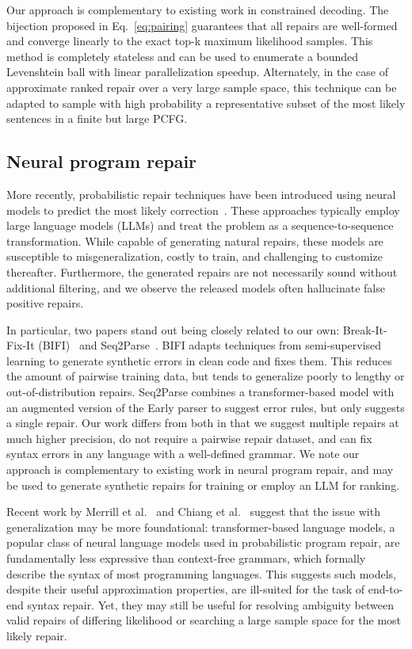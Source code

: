 \documentclass[runningheads]{llncs}
\begin{document}
  Our approach is complementary to existing work in constrained decoding. The bijection proposed in Eq.~\ref{eq:pairing} guarantees that all repairs are well-formed and converge linearly to the exact top-k maximum likelihood samples. This method is completely stateless and can be used to enumerate a bounded Levenshtein ball with linear parallelization speedup. Alternately, in the case of approximate ranked repair over a very large sample space, this technique can be adapted to sample with high probability a representative subset of the most likely sentences in a finite but large PCFG.

  \subsection{Neural program repair}

  More recently, probabilistic repair techniques have been introduced using neural models to predict the most likely correction~\cite{allamanis2021self,chirkova2021empirical,drain2021generating}. These approaches typically employ large language models (LLMs) and treat the problem as a sequence-to-sequence transformation. While capable of generating natural repairs, these models are susceptible to misgeneralization, costly to train, and challenging to customize thereafter. Furthermore, the generated repairs are not necessarily sound without additional filtering, and we observe the released models often hallucinate false positive repairs.

  In particular, two papers stand out being closely related to our own: Break-It-Fix-It (BIFI)~\cite{yasunaga2021break} and Seq2Parse~\cite{sakkas2022seq2parse}. BIFI adapts techniques from semi-supervised learning to generate synthetic errors in clean code and fixes them. This reduces the amount of pairwise training data, but tends to generalize poorly to lengthy or out-of-distribution repairs. Seq2Parse combines a transformer-based model with an augmented version of the Early parser to suggest error rules, but only suggests a single repair. Our work differs from both in that we suggest multiple repairs at much higher precision, do not require a pairwise repair dataset, and can fix syntax errors in any language with a well-defined grammar. We note our approach is complementary to existing work in neural program repair, and may be used to generate synthetic repairs for training or employ an LLM for ranking.

  Recent work by Merrill et al.~\cite{merrill2022saturated} and Chiang et al.~\cite{chiang2023tighter} suggest that the issue with generalization may be more foundational: transformer-based language models, a popular class of neural language models used in probabilistic program repair, are fundamentally less expressive than context-free grammars, which formally describe the syntax of most programming languages. This suggests such models, despite their useful approximation properties, are ill-suited for the task of end-to-end syntax repair. Yet, they may still be useful for resolving ambiguity between valid repairs of differing likelihood or searching a large sample space for the most likely repair.
\end{document}
